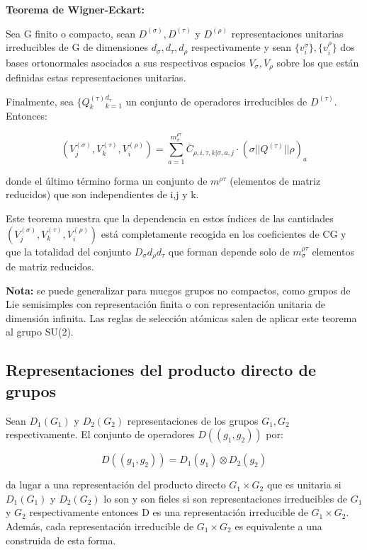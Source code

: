 \documentclass{article}
\begin{document}
       \smallskip
       \textbf{Teorema de Wigner-Eckart:}

\smallskip
Sea G finito o compacto, sean $D^{(\sigma)}, D^{(\tau)}$ y $D^{(\rho)}$ representaciones unitarias irreducibles de G de dimensiones $d_\sigma,d_\tau, d_\rho$ respectivamente y sean $\lbrace v_i^{\sigma}\rbrace, \lbrace v_i^{\rho}\rbrace $ dos bases ortonormales asociados a sus respectivos espacios $V_\sigma, V_\rho$ sobre los que están definidas estas representaciones unitarias.

Finalmente, sea $\lbrace Q_k^{(\tau)}_{k=1}^{d_\tau}$ un conjunto de operadores irreducibles de $D^{(\tau)}$. Entonces:

$$(V_j^{(\sigma)}, V_k^{(\tau)}, V_i^{(\rho)})=\sum _{a=1}^{m_\sigma ^{\rho \tau}} \bar{C}_{\rho, i, \tau ,k | \sigma , a, j}\cdot (\sigma || Q^{(\tau)}||\rho)_a$$

donde el último término forma un conjunto de $m^{\rho \tau}$ (elementos de matriz reducidos) que son independientes de i,j y k.

Este teorema muestra que la dependencia en estos índices de las cantidades $(V_j^{(\sigma)}, V_k^{(\tau)}, V_i^{(\rho)})$ está completamente recogida en los coeficientes de CG y que la totalidad del conjunto $D_\sigma d_\rho d_\tau$ que forman depende solo de $m^{\rho \tau}_\sigma$ elementos de matriz reducidos.

\smallskip
\textbf{Nota:} se puede generalizar para mucgos grupos no compactos, como grupos de Lie semisimples con representación finita o con representación unitaria de dimensión infinita.
Las reglas de selección atómicas salen de aplicar este teorema al grupo SU(2).

\subsection{Representaciones del producto directo de grupos}

Sean $D_1(G_1)$ y $D_2 (G_2)$ representaciones de los grupos $G_1, G_2$ respectivamente. El conjunto de operadores $D((g_1,g_2))$ por:

$$D((g_1,g_2))=D_1(g_1)\otimes D_2(g_2)$$

da lugar a una representación del producto directo $G_1\times G_2$ que es unitaria si $D_1(G_1)$ y $D_2(G_2)$ lo son y son fieles si son representaciones irreducibles de $G_1$ y $G_2$ respectivamente entonces D es una representación irreducible de $G_1 \times G_2$. Además, cada representación irreducible de $G_1 \times G_2$ es equivalente a una construida de esta forma.
\end{document}
